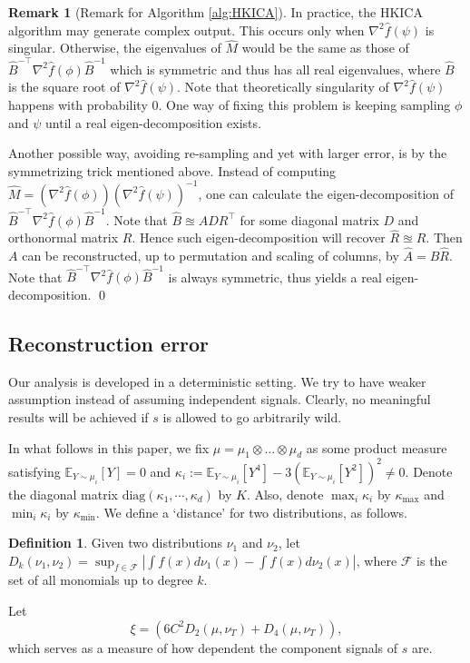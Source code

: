 \documentclass[twoside]{article}
\newcommand{\E}{\mathbb{E}}
\theoremstyle{definition}
\newtheorem{definition}[lemma]{Definition}
\newtheorem{remark}[lemma]{Remark}
\begin{document}
\begin{remark}[Remark for Algorithm \ref{alg:HKICA}]
\label{rmk:symmetrization}
In practice, the HKICA algorithm may generate complex output. 
This occurs only when $\nabla^2\widehat{f}(\psi)$ is singular. 
Otherwise, the eigenvalues of $\widehat{M}$ would be the same as those of
$\widehat{B}^{-\top}\nabla^2 \widehat{f}(\phi)\widehat{B}^{-1}$ which is symmetric and thus has all real eigenvalues, where $\widehat{B} $ is the square root of $\nabla^2\widehat{f}(\psi)$. 
Note that theoretically singularity of $\nabla^2\widehat{f}(\psi)$ happens with probability 0. 
One way of fixing this problem is keeping sampling $\phi$ and $\psi$ until a real eigen-decomposition exists.

Another possible way, avoiding re-sampling and yet with larger error, is by the symmetrizing trick mentioned above.
Instead of computing $\widehat{M} = (\nabla^2 \widehat{f}(\phi))(\nabla^2\widehat{f}(\psi))^{-1}$, one can calculate the eigen-decomposition of  $\widehat{B}^{-\top}\nabla^2 \widehat{f}(\phi)\widehat{B}^{-1}$. 
Note that $\widehat{B} \approxeq ADR^{\top}$ for some diagonal matrix $D$ and orthonormal matrix $R$. 
Hence such eigen-decomposition will recover $\widehat{R}\approxeq R$. 
Then $A$ can be reconstructed, up to permutation and scaling of columns, by $\widehat{A} = \widehat{B}\widehat{R}$.
Note that $ \widehat{B}^{-\top}\nabla^2 \widehat{f}(\phi)\widehat{B}^{-1}$ is always symmetric, thus yields a real eigen-decomposition. \qed
\end{remark}

\subsection{Reconstruction error}
\label{subsec:errorHK}
Our analysis is developed in a deterministic setting.
We try to have weaker assumption instead of assuming independent signals. 
Clearly, no meaningful results will be achieved if $s$ is allowed to go arbitrarily wild. 
 
In what follows in this paper, we fix $\mu = \mu_1\otimes \ldots \otimes \mu_d$ as some product measure
satisfying $\E_{Y\sim\mu_i}[Y]=0$ and $\kappa_i := \E_{Y\sim \mu_i}[Y^4] - 3\left(\E_{Y\sim \mu_i}[Y^2]\right)^2\neq 0$.
Denote the diagonal matrix $\text{diag}(\kappa_1,\cdots,\kappa_d)$ by $K$. 
Also, denote $\max_{i} \kappa_i$ by $\kappa_{\max}$ and $\min_{i} \kappa_i$ by $\kappa_{\min}$.
We define a `distance' for two distributions, as follows. 
\begin{definition}
Given two distributions $\nu_1$ and $\nu_2$, let $D_k(\nu_1,\nu_2) = \sup_{f\in\mathcal{F}} |\int f(x)d\nu_1(x) - \int f(x)d\nu_2(x)|$, where $\mathcal{F}$ is the set of all monomials up to degree $k$.
\end{definition} 
Let 
\begin{equation}
\label{eq:xi}
\xi = \left( 6C^2D_2(\mu, \nu_T) + D_4(\mu, \nu_T)\right),
\end{equation}
which serves as a measure of how dependent the  component signals of $s$ are.
\end{document}
